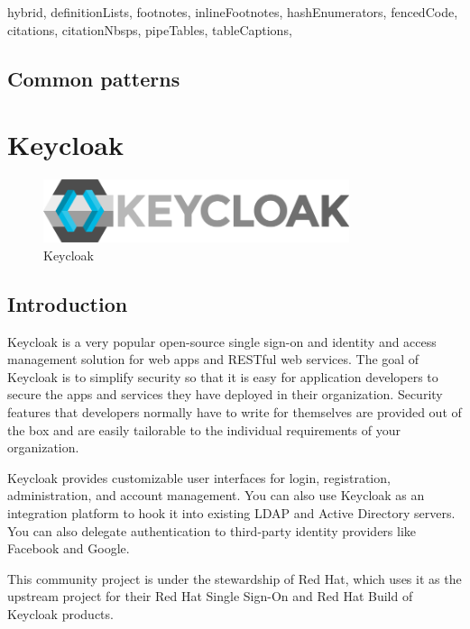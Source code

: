 \documentclass[
  digital,     %
  oneside,     %
  nosansbold,  %
  nocolorbold, %
  lof,         %
  lot,         %
]{fithesis4}
\begin{document}
\begin{markdown*}{%
  hybrid,
  definitionLists,
  footnotes,
  inlineFootnotes,
  hashEnumerators,
  fencedCode,
  citations,
  citationNbsps,
  pipeTables,
  tableCaptions,
}



\newpage
\section{Common patterns}

\chapter{Keycloak}

\begin{figure}[htbp]
  \centering
  \includegraphics[width=0.8\textwidth]{img/keycloak.png}
  \caption{Keycloak}
  \label{fig:keycloak-logo}
\end{figure}

\section{Introduction}
Keycloak is a very popular open-source single sign-on and identity and access management solution for web apps and RESTful web services.
The goal of Keycloak is to simplify security so that it is easy for application developers to secure the apps and services they have deployed in their organization.
Security features that developers normally have to write for themselves are provided out of the box and are easily tailorable to the individual requirements of your organization.

Keycloak provides customizable user interfaces for login, registration, administration, and account management.
You can also use Keycloak as an integration platform to hook it into existing LDAP and Active Directory servers.
You can also delegate authentication to third-party identity providers like Facebook and Google.

This community project is under the stewardship of Red Hat, which uses it as the upstream project for their Red Hat Single Sign-On and Red Hat Build of Keycloak products.



\end{markdown*}
\end{document}
